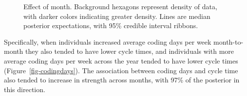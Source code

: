\documentclass[manuscript,screen,review]{acmart}
\begin{document}
\begin{figure}


\caption[Month effect on cycle time]{\label{fig-month}Effect of month.
Background hexagons represent density of data, with darker colors
indicating greater density. Lines are median posterior expectations,
with 95\% credible interval ribbons.}

\end{figure}%

Specifically, when individuals increased average coding days per week
month-to-month they also tended to have lower cycle times, and
individuals with more average coding days per week across the year
tended to have lower cycle times (Figure~\ref{fig-codingdays}). The
association between coding days and cycle time also tended to increase
in strength across months, with 97\% of the posterior in this direction.
\end{document}
